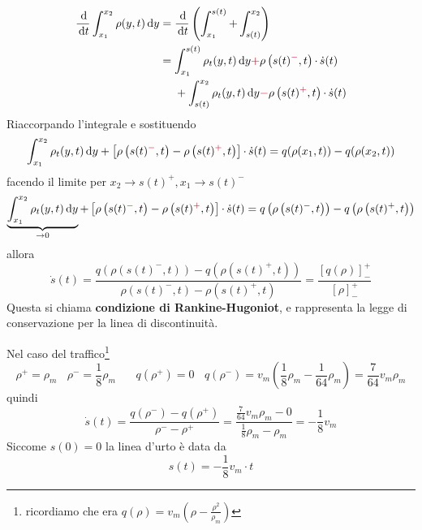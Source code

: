 \begin{align*}
    \frac{\de}{\dt}\int ^{x_{2}}_{x_{1}} \rho (y,t) \dy & =\frac{\de}{\dt}\left(\int ^{s(t)}_{x_{1}} +\int ^{x_{2}}_{s(t)}\right)                                                                                             \\
                                                        & =\int ^{s(t)}_{x_{1}} \rho _{t}(y,t) \dy\textcolor[rgb]{0.82,0.01,0.11}{+} \rho \left(s(t)\textcolor[rgb]{0.82,0.01,0.11}{^{-}} ,t\right) \cdotp \dot{s}(t)         \\
                                                        & \ \ \ \ +\int ^{x_{2}}_{s(t)} \rho _{t}(y,t) \dy\textcolor[rgb]{0.82,0.01,0.11}{-} \rho \left(s(t)\textcolor[rgb]{0.82,0.01,0.11}{^{+}} ,t\right) \cdotp \dot{s}(t)
\end{align*}
Riaccorpando l'integrale e sostituendo
\begin{equation*}
    \int ^{x_{2}}_{x_{1}} \rho _{t}(y,t) \dy+\left[ \rho \left(s(t)\textcolor[rgb]{0.82,0.01,0.11}{^{-}} ,t\right) -\rho \left(s(t)\textcolor[rgb]{0.82,0.01,0.11}{^{+}} ,t\right)\right] \cdotp \dot{s}(t) =q(\rho (x_{1} ,t)) -q(\rho (x_{2} ,t))
\end{equation*}
facendo il limite per $x_{2}\rightarrow s(t)^{+} ,x_{1}\rightarrow s(t)^{-}$
\begin{equation*}
    \underbrace{\int ^{x_{2}}_{x_{1}} \rho _{t}(y,t) \dy}_{\rightarrow 0} +\left[ \rho \left(s(t)\textcolor[rgb]{0.82,0.01,0.11}{^{-}} ,t\right) -\rho \left(s(t)\textcolor[rgb]{0.82,0.01,0.11}{^{+}} ,t\right)\right] \cdotp \dot{s}(t) =q\left(\rho \left(s(t)^{-} ,t\right)\right) -q\left(\rho \left(s(t)^{+} ,t\right)\right)
\end{equation*}
allora
\begin{equation}
    \dot{s}(t) =\frac{q\left(\rho \left(s(t)^{-} ,t\right)\right) -q\left(\rho \left(s(t)^{+} ,t\right)\right)}{\rho \left(s(t)^{-} ,t\right) -\rho \left(s(t)^{+} ,t\right)} =\frac{[ q(\rho)]^{+}_{-}}{[ \rho ]^{+}_{-}}
\end{equation}
Questa si chiama \textbf{condizione di Rankine-Hugoniot}, e rappresenta la legge di conservazione per la linea di discontinuità.

Nel caso del traffico\footnote{ricordiamo che era $q(\rho) =v_{m}\left(\rho -\frac{\rho ^{2}}{\rho _{m}}\right)$}
\begin{equation*}
    \rho ^{+} =\rho _{m} \ \ \ \ \rho ^{-} =\frac{1}{8} \rho _{m} \ \ \ \ \ \ \ \ q\left(\rho ^{+}\right) =0\ \ \ \ q\left(\rho ^{-}\right) =v_{m}\left(\frac{1}{8} \rho _{m} -\frac{1}{64} \rho _{m}\right) =\frac{7}{64} v_{m} \rho _{m}
\end{equation*}
quindi
\begin{equation*}
    \dot{s}(t) =\frac{q\left(\rho ^{-}\right) -q\left(\rho ^{+}\right)}{\rho ^{-} -\rho ^{+}} =\frac{\frac{7}{64} v_{m} \rho _{m} -0}{\frac{1}{8} \rho _{m} -\rho _{m}} =-\frac{1}{8} v_{m}
\end{equation*}
Siccome $s(0) =0$ la linea d'urto è data da
\begin{equation*}
    s(t) =-\frac{1}{8} v_{m} \cdotp t
\end{equation*}

